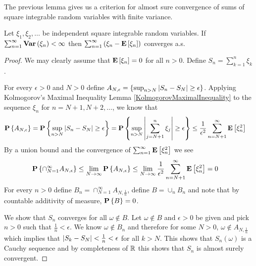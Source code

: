 The previous lemma gives us a criterion for almost sure convergence of
sums of square integrable random variables with finite variance.
\begin{lem}\label{VarianceCriterionSeries}Let $\xi_1, \xi_2,\dots$ be independent square integrable
  random variables.  If $\sum_{n=1}^\infty \textbf{Var} \left (\xi_n \right ) < \infty$
  then $\sum_{n=1}^\infty \left (\xi_n - \textbf{E}\left[\xi_n\right]\right )$
  converges a.s.
\end{lem}
\begin{proof}
We may clearly assume that $\textbf{E}\left[\xi_n\right] = 0$ for all $n > 0$.
Define $S_n = \sum_{k=1}^n \xi_k$.

For every $\epsilon > 0$ and $N > 0$ define $A_{N,\epsilon}= \lbrace
\sup_{n > N} \left \vert S_n - S_N \right \vert \geq \epsilon \rbrace$.  Applying Kolmogorov's Maximal Inequality Lemma
\ref{KolmogorovMaximalInequality} to the sequence $\xi_n$ for $n=N+1, N+2,
\dots$, we know that
\begin{align*}
\textbf{P}\left \{A_{N,\epsilon} \right \} 
&= \textbf{P}\left \{\sup_{n > N} \left \vert S_n - S_N \right \vert \geq  \epsilon \right \} 
=\textbf{P}\left \{\sup_{n > N} \left \vert \sum_{j=N+1}^n \xi_j \right \vert \geq  \epsilon \right \} 
\leq \frac{1}{\epsilon^2}\sum_{n=N+1}^\infty \textbf{E}\left[\xi_n^2\right]
\end{align*}
By a union bound and the convergence of $\sum_{n=1}^\infty \textbf{E}\left[\xi_n^2\right]$ we see
\begin{align*}
\textbf{P}\left \{\cap_{N=1}^\infty  A_{N,\epsilon} \right \} 
&\leq \lim_{N \to \infty} \textbf{P}\left \{A_{N,\epsilon} \right \} 
\leq \lim_{N\to \infty} \frac{1}{\epsilon^2}\sum_{n=N+1}^\infty \textbf{E}\left[\xi_n^2\right] 
= 0
\end{align*}
For every $n>0$ define $B_n
=\cap_{N=1}^\infty A_{N,\frac{1}{n}}$, define $B = \cup_n B_n$  and note that by
countable additivity of measure, $\textbf{P}\left \{B \right \} = 0$.  

We show that $S_n$ converges for all $\omega \notin B$.  Let $\omega \notin
B$ and $\epsilon > 0$ be given and pick $n>0$ such that $\frac{1}{n} < \epsilon$.  We know $\omega \notin B_n$ and
therefore for some $N>0$, $\omega \notin A_{N,\frac{1}{n}}$ which implies that  $\left \vert S_k -
  S_N \right \vert < \frac{1}{n} < \epsilon$ for all $k > N$.  This shows that
$S_n(\omega)$ is a Cauchy sequence and by
completeness of $\mathbb{R}$ this shows that $S_n$ is almost surely convergent.


\end{proof}
